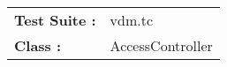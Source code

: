 
























































































































\begin{tabular}{p{25mm}l}
{\bf Test Suite :} & vdm.tc \\ 
{\bf Class :} & AccessController \\ 
\end{tabular}

